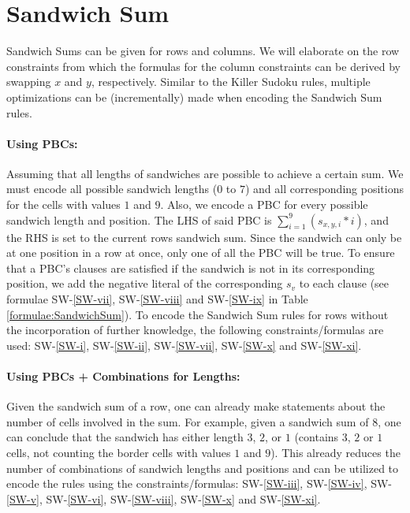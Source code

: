 \FloatBarrier
\newpage
\section{Sandwich Sum}
Sandwich Sums can be given for rows and columns. We will elaborate on the row constraints from which the formulas for the column constraints can be derived by swapping $x$ and $y$, respectively. Similar to the Killer Sudoku rules, multiple optimizations can be (incrementally) made when encoding the Sandwich Sum rules.

\paragraph{Using PBCs:} Assuming that all lengths of sandwiches are possible to achieve a certain sum. We must encode all possible sandwich lengths ($0$ to $7$) and all corresponding positions for the cells with values $1$ and $9$. Also, we encode a PBC for every possible sandwich length and position. The LHS of said PBC is $\sum_{i=1}^{9} (s_{x,y,i}*i)$, and the RHS is set to the current rows sandwich sum. Since the sandwich can only be at one position in a row at once, only one of all the PBC will be true. To ensure that a PBC's clauses are satisfied if the sandwich is not in its corresponding position, we add the negative literal of the corresponding $s_v$ to each clause (see formulae SW-\ref{SW-vii}, SW-\ref{SW-viii} and SW-\ref{SW-ix} in Table \ref{formulae:SandwichSum}). To encode the Sandwich Sum rules for rows without the incorporation of further knowledge, the following constraints/formulas are used: SW-\ref{SW-i}, SW-\ref{SW-ii}, SW-\ref{SW-vii}, SW-\ref{SW-x} and SW-\ref{SW-xi}.

\paragraph{Using PBCs + Combinations for Lengths:} Given the sandwich sum of a row, one can already make statements about the number of cells involved in the sum. For example, given a sandwich sum of $8$, one can conclude that the sandwich has either length $3$, $2$, or $1$ (contains $3$, $2$ or $1$ cells, not counting the border cells with values $1$ and $9$). This already reduces the number of combinations of sandwich lengths and positions and can be utilized to encode the rules using the constraints/formulas: SW-\ref{SW-iii}, SW-\ref{SW-iv}, SW-\ref{SW-v}, SW-\ref{SW-vi}, SW-\ref{SW-viii}, SW-\ref{SW-x} and SW-\ref{SW-xi}.

